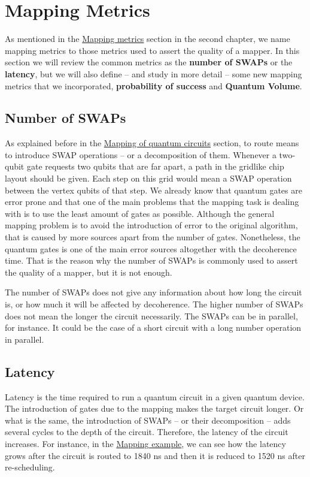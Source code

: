 \section{Mapping Metrics}
\label{sec:org04516e7}
As mentioned in the \href{chapter-2.org}{Mapping metrics} section in the second chapter, we name mapping metrics to those metrics used to assert the quality of a mapper.
In this section we will review the common metrics as the \textbf{number of SWAPs} or the \textbf{latency}, but we will also define -- and study in more detail -- some new mapping metrics that we incorporated, \textbf{probability of success} and \textbf{Quantum Volume}.

\subsection{Number of SWAPs}
\label{sec:org62a8c0d}

As explained before in the \href{chapter-2.org}{Mapping of quantum circuits} section, to route means to introduce SWAP operations -- or a decomposition of them.
Whenever a two-qubit gate requests two qubits that are far apart, a path in the gridlike chip layout should be given.
Each step on this grid would mean a SWAP operation between the vertex qubits of that step.
We already know that quantum gates are error prone and that one of the main problems that the mapping task is dealing with is to use the least amount of gates as possible.
Although the general mapping problem is to avoid the introduction of error to the original algorithm, that is caused by more sources apart from the number of gates.
Nonetheless, the quantum gates is one of the main error sources altogether with the decoherence time.
That is the reason why the number of SWAPs is commonly used to assert the quality of a mapper, but it is not enough.

The number of SWAPs does not give any information about how long the circuit is, or how much it will be affected by decoherence.
The higher number of SWAPs does not mean the longer the circuit necessarily.
The SWAPs can be in parallel, for instance.
It could be the case of a short circuit with a long number operation in parallel.

\subsection{Latency}
\label{sec:org0ce479e}

Latency is the time required to run a quantum circuit in a given quantum device.
The introduction of gates due to the mapping makes the target circuit longer.
Or what is the same, the introduction of SWAPs -- or their decomposition -- adds several cycles to the depth of the circuit.
Therefore, the latency of the circuit increases.
For instance, in the \href{mapping_of_quantum_circuits.org}{Mapping example}, we can see how the latency grows after the circuit is routed to 1840 ns and then it is reduced to 1520 ns after re-scheduling.


